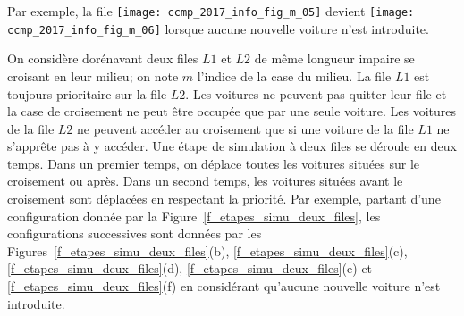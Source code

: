 Par exemple, la file \texttt{[image: ccmp\_2017\_info\_fig\_m\_05]}
 devient \texttt{[image: ccmp\_2017\_info\_fig\_m\_06]}
lorsque aucune nouvelle voiture n'est introduite.




On considère dorénavant deux files $L1$ et $L2$ de même longueur impaire se croisant en leur
milieu; on note $m$ l'indice de la case du milieu. La file $L1$ est toujours prioritaire sur la file $L2$. Les
voitures ne peuvent pas quitter leur file et la case de croisement ne peut être occupée que par une
seule voiture. Les voitures de la file $L2$ ne peuvent accéder au croisement que si une voiture de la
file $L1$ ne s'apprête pas à y accéder. Une étape de simulation à deux files se déroule en deux temps.
Dans un premier temps, on déplace toutes les voitures situées sur le croisement ou après. Dans un
second temps, les voitures situées avant le croisement sont déplacées en respectant la priorité. Par
exemple, partant d'une configuration donnée par la Figure~\ref{f_etapes_simu_deux_files}, les configurations successives sont
données par les Figures~\ref{f_etapes_simu_deux_files}(b), \ref{f_etapes_simu_deux_files}(c), \ref{f_etapes_simu_deux_files}(d), \ref{f_etapes_simu_deux_files}(e) et \ref{f_etapes_simu_deux_files}(f) en considérant qu'aucune nouvelle voiture n'est
introduite.






